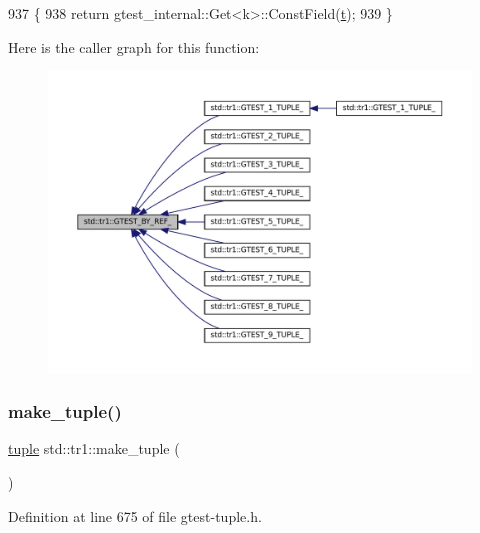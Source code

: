 \begin{DoxyCode}
937                                  \{
938   \textcolor{keywordflow}{return} gtest\_internal::Get<k>::ConstField(\hyperlink{namespacebattery__monitor__node_a7a63d20d1ea461e280f4eb5b47f925cd}{t});
939 \}
\end{DoxyCode}
Here is the caller graph for this function\+:
\nopagebreak
\begin{figure}[H]
\begin{center}
\leavevmode
\includegraphics[width=350pt]{namespacestd_1_1tr1_ae7b5ea477ac34a3eef5c4c15c42b76ed_icgraph}
\end{center}
\end{figure}
\mbox{\label{namespacestd_1_1tr1_af7e12a0f5b5791b5b7c49a5a17b85359}} 
\subsubsection{\texorpdfstring{make\+\_\+tuple()}{make\_tuple()}}
{\footnotesize\ttfamily \hyperlink{classstd_1_1tr1_1_1tuple}{tuple} std\+::tr1\+::make\+\_\+tuple (\begin{DoxyParamCaption}{ }\end{DoxyParamCaption})\hspace{0.3cm}{\ttfamily [inline]}}



Definition at line 675 of file gtest-\/tuple.\+h.



